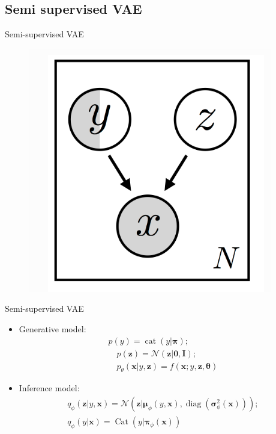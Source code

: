 \subsection{Semi supervised VAE}

\begin{frame}{Semi-supervised VAE}
\begin{figure}
\includegraphics[scale=0.45]{semi-sup}
\end{figure}
\end{frame}

\begin{frame}{Semi-supervised VAE}

\begin{itemize}
\item Generative model:
\begin{equation}
\begin{aligned}
p(y)=\operatorname{cat}(y | \boldsymbol{\pi}) ;\\
\quad p(\mathbf{z})=\mathcal{N}(\mathbf{z} | \mathbf{0}, \mathbf{I}) ;\\
\quad p_{\theta}(\mathbf{x} | y, \mathbf{z})=f(\mathbf{x} ; y, \mathbf{z}, \boldsymbol{\theta})
\end{aligned}
\end{equation}
\item Inference model:
\begin{equation}
\begin{aligned}
q_{\phi}(\mathbf{z} | y, \mathbf{x})=\mathcal{N}\left(\mathbf{z} | \boldsymbol{\mu}_{\phi}(y, \mathbf{x}), \operatorname{diag}\left(\boldsymbol{\sigma}_{\phi}^{2}(\mathbf{x})\right)\right) ; \\
q_{\phi}(y | \mathbf{x})=\operatorname{Cat}\left(y | \boldsymbol{\pi}_{\phi}(\mathbf{x})\right)
\end{aligned}
\end{equation}
\end{itemize}
\end{frame}

